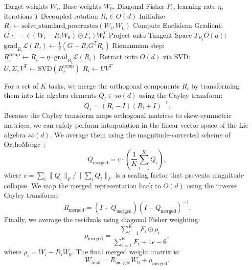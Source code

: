 \documentclass{article}
\theoremstyle{plain}
\theoremstyle{definition}
\theoremstyle{remark}
\begin{document}
\begin{algorithm}[tb]
  \caption{Riemannian Gradient Descent Solver for FOMM}
  \label{alg:rgd}
  \begin{algorithmic}
     Target weights $W_i$, Base weights $W_0$, Diagonal Fisher $F_i$, learning rate $\eta$, iterations $T$
     Decoupled rotation $R_i \in O(d)$
    \STATE Initialize $R_i \leftarrow \text{solve\_standard\_procrustes}(W_i, W_0)$
    \STATE Compute Euclidean Gradient:
    \STATE \quad $G \leftarrow - ((W_i - R_i W_0) \odot F_i) W_0^T$
    \STATE Project onto Tangent Space $T_{R_i} O(d)$:
    \STATE \quad $\text{grad}_{R_i} \mathcal{L}(R_i) \leftarrow \frac{1}{2} (G - R_i G^T R_i)$
    \STATE Riemannian step:
    \STATE \quad $R_i^{\text{temp}} \leftarrow R_i - \eta \cdot \text{grad}_{R_i} \mathcal{L}(R_i)$
    \STATE Retract onto $O(d)$ via SVD:
    \STATE \quad $U, \Sigma, V^T \leftarrow \text{SVD}(R_i^{\text{temp}})$
    \STATE \quad $R_i \leftarrow U V^T$
    \ENDFOR
  \end{algorithmic}
\end{algorithm}

For a set of $K$ tasks, we merge the orthogonal components $R_i$ by transforming them into Lie algebra elements $Q_i \in so(d)$ using the Cayley transform:
\begin{equation}
\label{eq:cayley}
Q_i = (R_i - I)(R_i + I)^{-1}.
\end{equation}
Because the Cayley transform maps orthogonal matrices to skew-symmetric matrices, we can safely perform interpolation in the linear vector space of the Lie algebra $so(d)$. We average them using the magnitude-corrected scheme of OrthoMerge~\cite{yang26}:
\begin{equation}
Q_{\text{merged}} = c \cdot \left( \frac{1}{K} \sum_{i=1}^K Q_i \right),
\end{equation}
where $c = \sum_i \|Q_i\|_F / \|\sum_i Q_i\|_F$ is a scaling factor that prevents magnitude collapse. We map the merged representation back to $O(d)$ using the inverse Cayley transform:
\begin{equation}
\label{eq:inv_cayley}
R_{\text{merged}} = (I + Q_{\text{merged}})(I - Q_{\text{merged}})^{-1}.
\end{equation}
Finally, we average the residuals using diagonal Fisher weighting:
\begin{equation}
\rho_{\text{merged}} = \frac{\sum_{i=1}^K F_i \odot \rho_i}{\sum_{i=1}^K F_i + 1e-6},
\end{equation}
where $\rho_i = W_i - R_i W_0$. The final merged weight matrix is:
\begin{equation}
W_{\text{final}} = R_{\text{merged}} W_0 + \rho_{\text{merged}}.
\end{equation}
\end{document}
